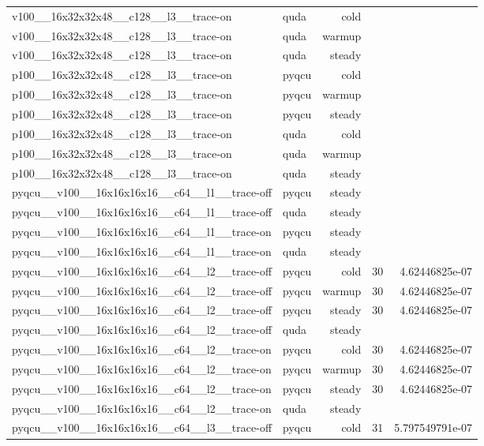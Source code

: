 \begin{table}[htbp]
\begin{tabular}{@{}llrrr@{}}
v100\_\_16x32x32x48\_\_c128\_\_l3\_\_trace-on & quda & cold &  &  \\
v100\_\_16x32x32x48\_\_c128\_\_l3\_\_trace-on & quda & warmup &  &  \\
v100\_\_16x32x32x48\_\_c128\_\_l3\_\_trace-on & quda & steady &  &  \\
p100\_\_16x32x32x48\_\_c128\_\_l3\_\_trace-on & pyqcu & cold &  &  \\
p100\_\_16x32x32x48\_\_c128\_\_l3\_\_trace-on & pyqcu & warmup &  &  \\
p100\_\_16x32x32x48\_\_c128\_\_l3\_\_trace-on & pyqcu & steady &  &  \\
p100\_\_16x32x32x48\_\_c128\_\_l3\_\_trace-on & quda & cold &  &  \\
p100\_\_16x32x32x48\_\_c128\_\_l3\_\_trace-on & quda & warmup &  &  \\
p100\_\_16x32x32x48\_\_c128\_\_l3\_\_trace-on & quda & steady &  &  \\
pyqcu\_\_v100\_\_16x16x16x16\_\_c64\_\_l1\_\_trace-off & pyqcu & steady &  &  \\
pyqcu\_\_v100\_\_16x16x16x16\_\_c64\_\_l1\_\_trace-off & quda & steady &  &  \\
pyqcu\_\_v100\_\_16x16x16x16\_\_c64\_\_l1\_\_trace-on & pyqcu & steady &  &  \\
pyqcu\_\_v100\_\_16x16x16x16\_\_c64\_\_l1\_\_trace-on & quda & steady &  &  \\
pyqcu\_\_v100\_\_16x16x16x16\_\_c64\_\_l2\_\_trace-off & pyqcu & cold & 30 & 4.62446825e-07 \\
pyqcu\_\_v100\_\_16x16x16x16\_\_c64\_\_l2\_\_trace-off & pyqcu & warmup & 30 & 4.62446825e-07 \\
pyqcu\_\_v100\_\_16x16x16x16\_\_c64\_\_l2\_\_trace-off & pyqcu & steady & 30 & 4.62446825e-07 \\
pyqcu\_\_v100\_\_16x16x16x16\_\_c64\_\_l2\_\_trace-off & quda & steady &  &  \\
pyqcu\_\_v100\_\_16x16x16x16\_\_c64\_\_l2\_\_trace-on & pyqcu & cold & 30 & 4.62446825e-07 \\
pyqcu\_\_v100\_\_16x16x16x16\_\_c64\_\_l2\_\_trace-on & pyqcu & warmup & 30 & 4.62446825e-07 \\
pyqcu\_\_v100\_\_16x16x16x16\_\_c64\_\_l2\_\_trace-on & pyqcu & steady & 30 & 4.62446825e-07 \\
pyqcu\_\_v100\_\_16x16x16x16\_\_c64\_\_l2\_\_trace-on & quda & steady &  &  \\
pyqcu\_\_v100\_\_16x16x16x16\_\_c64\_\_l3\_\_trace-off & pyqcu & cold & 31 & 5.797549791e-07 \\

\end{tabular}
\end{table}
